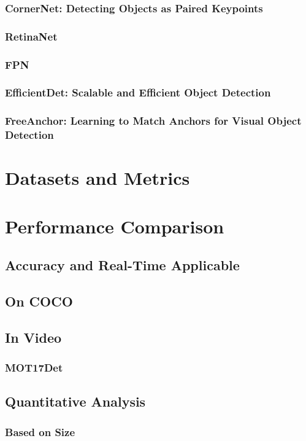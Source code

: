 \documentclass[12pt, oneside]{article}
\begin{document}
\subsubsection{CornerNet: Detecting Objects as Paired Keypoints}

\vfill

\subsubsection{RetinaNet}
\subsubsection{FPN}
\subsubsection{EfficientDet: Scalable and Efficient Object Detection}
\subsubsection{FreeAnchor: Learning to Match Anchors for Visual Object Detection}

\section{Datasets and Metrics}
\section{Performance Comparison}
\subsection{Accuracy and Real-Time Applicable}
\subsection{On COCO}

\subsection{In Video}
\subsubsection{MOT17Det}

\subsection{Quantitative Analysis}
\subsubsection{Based on Size}
\end{document}
